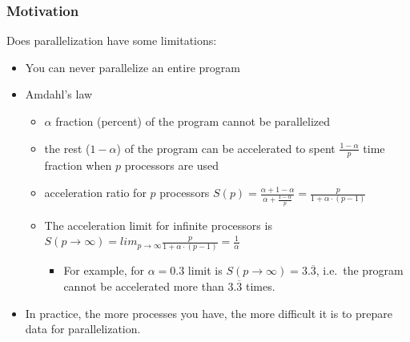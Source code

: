 \documentclass{beamer}
\begin{document}
\begin{frame}
\frametitle{Motivation}
Does parallelization have some limitations:
\begin{itemize}
\item You can never parallelize an entire program
\item Amdahl's law
  \begin{itemize}
  \item $\alpha$ fraction (percent) of the program cannot be parallelized
  \item the rest ($1-\alpha$) of the program can be accelerated to spent $\frac{1 - \alpha}{p}$ time fraction when $p$ processors are used
  \item acceleration ratio for $p$ processors $S(p) = \frac{\alpha + 1 - \alpha}{\alpha + \frac{1-\alpha}{p}} = \frac{p}{1+\alpha \cdot (p-1)}$
  \item The acceleration limit for infinite processors is $S(p\to\infty) = lim_{p\to\infty}\frac{p}{1+\alpha \cdot (p-1)} = \frac{1}{\alpha}$
    \begin{itemize}
    \item For example, for $\alpha=0.3$ limit is $S(p\to\infty) = 3.\overline{3}$, i.e.\ the program cannot be accelerated more than $3.\overline{3}$ times.
    \end{itemize}
  \end{itemize}
\item In practice, the more processes you have, the more difficult it is to prepare data for parallelization.
\end{itemize}
\end{frame}
\end{document}

